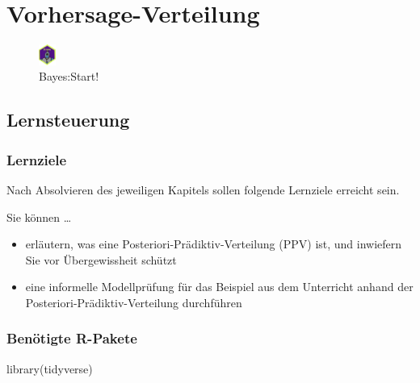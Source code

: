 \documentclass[
  a4paper,
  DIV=11]{scrreprt}
\newenvironment{Shaded}{\begin{snugshade}}{\end{snugshade}}
\newcommand{\FunctionTok}[1]{\textcolor[rgb]{0.28,0.35,0.67}{#1}}
\newcommand{\NormalTok}[1]{\textcolor[rgb]{0.00,0.23,0.31}{#1}}
\providecommand{\tightlist}{%
  \setlength{\itemsep}{0pt}\setlength{\parskip}{0pt}}\usepackage{longtable,booktabs,array}
\theoremstyle{definition}
\theoremstyle{remark}
\begin{document}

\hypertarget{vorhersage-verteilung}{%
\chapter{Vorhersage-Verteilung}\label{vorhersage-verteilung}}

\begin{figure}

{\centering \includegraphics[width=0.05\textwidth,height=\textheight]{./img/Golem_hex.png}

}

\caption{Bayes:Start!}

\end{figure}

\hypertarget{lernsteuerung-5}{%
\section{Lernsteuerung}\label{lernsteuerung-5}}

\hypertarget{lernziele-6}{%
\subsection{Lernziele}\label{lernziele-6}}

Nach Absolvieren des jeweiligen Kapitels sollen folgende Lernziele
erreicht sein.

Sie können \ldots{}

\begin{itemize}
\tightlist
\item
  erläutern, was eine Posteriori-Prädiktiv-Verteilung (PPV) ist, und
  inwiefern Sie vor Übergewissheit schützt
\item
  eine informelle Modellprüfung für das Beispiel aus dem Unterricht
  anhand der Posteriori-Prädiktiv-Verteilung durchführen
\end{itemize}

\hypertarget{benuxf6tigte-r-pakete-3}{%
\subsection{Benötigte R-Pakete}\label{benuxf6tigte-r-pakete-3}}

\begin{Shaded}
\begin{Highlighting}[]
\FunctionTok{library}\NormalTok{(tidyverse)}
\end{Highlighting}
\end{Shaded}
\end{document}

